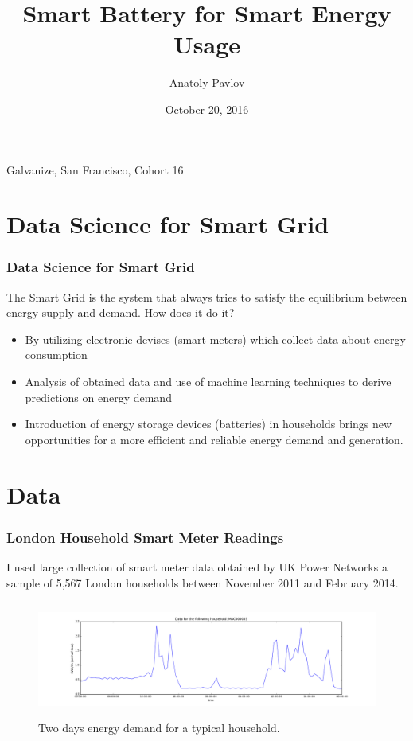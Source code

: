\documentclass{beamer}
\title{Smart Battery for Smart Energy Usage}
\author{Anatoly Pavlov}
\date{October 20, 2016}
\begin{document}
\begin{frame}
\titlepage
\centering
{Galvanize, San Francisco, Cohort 16}
\end{frame}

\section{Data Science for Smart Grid}
\begin{frame}
\frametitle{Data Science for Smart Grid}
The Smart Grid is the system that always tries to satisfy the equilibrium between energy supply and demand. How does it do it?

\begin{itemize}
\item By utilizing electronic devises (smart meters) which collect data about energy consumption
\item Analysis of obtained data and use of machine learning techniques to derive predictions on energy demand
\item Introduction of energy storage devices (batteries) in households brings new opportunities for a more efficient and reliable energy demand and generation.
\end{itemize}
\end{frame}

\section{Data}
\begin{frame}
\frametitle{London Household Smart Meter Readings}
I used large collection of smart meter data obtained by UK Power Networks a sample of 5,567 London households between November 2011 and February 2014.

\begin{figure}[htb]
\begin{center}
    \includegraphics[height=1.5in, width=\textwidth]{../img/fig1.png}

   \caption{Two days energy demand for a typical household.}

    \label{fig:MAC000035_2days_sample}
    \end{center}
\end{figure}

\end{frame}
\end{document}
